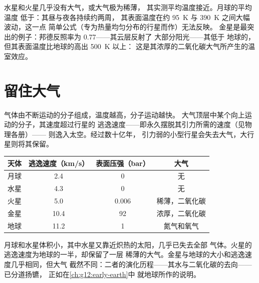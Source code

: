 \begin{remark}[读图]\label{rem:g10:habitable-planet:reading}
水星和火星几乎没有大气，或大气极为稀薄，
其实测平均温度接近。月球的平均温度
低于：其昼与夜各持续约两周，
其表面温度在约 \qty{95}{K} 与 \qty{390}{K} 之间大幅波动，这一点
简单公式（专为热量均匀分布的行星而作）无法反映。
金星是最突出的例子：邦德反照率为 0.77——其云层反射了
大部分阳光——其低于
地球的，但其表面温度比地球的高出 \qty{500}{K} 以上：
这是其浓厚的二氧化碳大气所产生的温室效应。
\end{remark}

\section{留住大气}

气体由不断运动的分子组成，温度越高，分子运动越快。
大气顶层中某个向上运动的分子，其速度超过行星的
逃逸速度——即永久摆脱其引力所需的速度（见物理各册）——
则逸入太空。经过数十亿年，
引力弱的小型行星会失去大气，大行星则将其保留。

\begin{center}
\small
\begin{tabular}{lccc}
\hline
天体 & 逃逸速度（\unit{km/s}） & 表面压强（bar） & 大气 \\
\hline
月球 & 2.4 & 0 & 无 \\
水星 & 4.3 & 0 & 无 \\
火星 & 5.0 & 0.006 & 稀薄，二氧化碳 \\
金星 & 10.4 & 92 & 浓厚，二氧化碳 \\
地球 & 11.2 & 1 & 氮气和氧气 \\
\hline
\end{tabular}
\end{center}

\begin{remark}[尺寸并非全部原因]\label{rem:g10:habitable-planet:size}
月球和水星体积小，其中水星又靠近炽热的太阳，几乎已失去全部
气体。火星的逃逸速度为地球的一半，却保留了一层
稀薄的大气。金星与地球的大小和逃逸速度几乎相同，但大气
截然不同：二者的演化历程——其水与二氧化碳的去向——已分道扬镳，
正如在\cref{ch:g12:early-earth}中
就地球所作的说明。
\end{remark}

